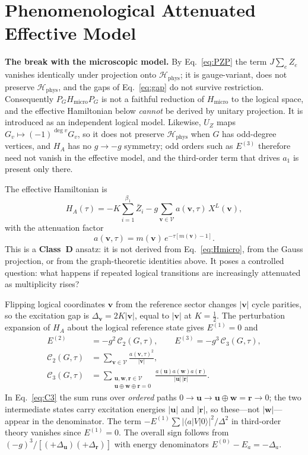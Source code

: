 \documentclass[10pt,twocolumn]{article}
\theoremstyle{definition}
\newcommand{\Hphys}{\mathcal{H}_{\mathrm{phys}}}
\newcommand{\Hmicro}{H_{\mathrm{micro}}}
\newcommand{\XL}{X^{L}}
\begin{document}
\section{Phenomenological Attenuated Effective Model}\label{sec:eff}
\textbf{The break with the microscopic model.} By Eq.~\eqref{eq:PZP} the term $J\sum_eZ_e$ vanishes identically under projection onto $\Hphys$; it is gauge-variant, does not preserve $\Hphys$, and the gaps of Eq.~\eqref{eq:gap} do not survive restriction. Consequently $P_G\Hmicro P_G$ is not a faithful reduction of $\Hmicro$ to the logical space, and the effective Hamiltonian below \emph{cannot} be derived by unitary projection. It is introduced as an independent logical model. Likewise, $U_Z$ maps $G_v\mapsto(-1)^{\deg v}G_v$, so it does not preserve $\Hphys$ when $G$ has odd-degree vertices, and $H_A$ has no $g\to-g$ symmetry; odd orders such as $E^{(3)}$ therefore need not vanish in the effective model, and the third-order term that drives $a_1$ is present only there.

The effective Hamiltonian is
\begin{equation}
H_A(\tau)=-K\sum_{i=1}^{\beta_1}\bar Z_i-g\sum_{\mathbf v\in\mathcal V}a(\mathbf v,\tau)\,\XL(\mathbf v), \label{eq:HA}
\end{equation}
with the attenuation factor
\begin{equation}
a(\mathbf v,\tau)=m(\mathbf v)\,e^{-\tau[m(\mathbf v)-1]}. \label{eq:a}
\end{equation}
This is a \textbf{Class~D} ansatz: it is not derived from Eq.~\eqref{eq:Hmicro}, from the Gauss projection, or from the graph-theoretic identities above. It poses a controlled question: what happens if repeated logical transitions are increasingly attenuated as multiplicity rises?

Flipping logical coordinates $\mathbf v$ from the reference sector changes $|\mathbf v|$ cycle parities, so the excitation gap is $\Delta_{\mathbf v}=2K|\mathbf v|$, equal to $|\mathbf v|$ at $K=\tfrac12$. The perturbation expansion of $H_A$ about the logical reference state gives $E^{(1)}=0$ and
\begin{align}
E^{(2)}&=-g^2\,\mathcal C_2(G,\tau), \qquad E^{(3)}=-g^3\,\mathcal C_3(G,\tau),\label{eq:E23}\\
\mathcal C_2(G,\tau)&=\sum_{\mathbf v\in\mathcal V}\frac{a(\mathbf v,\tau)^2}{|\mathbf v|}, \label{eq:C2}\\
\mathcal C_3(G,\tau)&=\sum_{\substack{\mathbf u,\mathbf w,\mathbf r\in\mathcal V\\ \mathbf u\oplus\mathbf w\oplus\mathbf r=0}}\frac{a(\mathbf u)a(\mathbf w)a(\mathbf r)}{|\mathbf u|\,|\mathbf r|}. \label{eq:C3}
\end{align}
In Eq.~\eqref{eq:C3} the sum runs over \emph{ordered} paths $0\to\mathbf u\to\mathbf u\oplus\mathbf w=\mathbf r\to0$; the two intermediate states carry excitation energies $|\mathbf u|$ and $|\mathbf r|$, so these---not $|\mathbf w|$---appear in the denominator. The term $-E^{(1)}\sum|\langle a|V|0\rangle|^2/\Delta^2$ in third-order theory vanishes since $E^{(1)}=0$. The overall sign follows from $(-g)^3/[(+\Delta_{\mathbf u})(+\Delta_{\mathbf r})]$ with energy denominators $E^{(0)}-E_a=-\Delta_a$.
\end{document}
